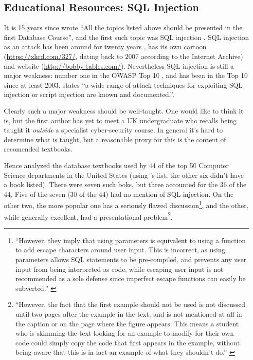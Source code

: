 \documentclass[sigconf,anonymous]{acmart}
\begin{document}
\subsection{Educational Resources: SQL Injection}\label{sec:SQL}
It is 15 years since \cite{Guimaraesetal2004} 
wrote ``All the topics listed above should be presented in the first
Database Course'', and the first such topic was SQL injection \cite{SPIDynamics2002,Anonymous2018b}. SQL injection as an attack has been around for twenty years \cite{HornerHyslip2017a}, has its own cartoon (\url{https://xkcd.com/327/}, dating back to 2007 according to the Internet Archive) and website (\url{http://bobby-tables.com/}). Nevertheless SQL injection is still a major weakness: number one in the OWASP Top 10 \cite{OWASP2017a}, and has been in the Top 10 since at least 2003.  \cite[the UK's definitive reference]{Bristol2018a} states ``a wide range of attack techniques for exploiting SQL
injection or script injection are known and documented.''.

Clearly such a major weakness should be well-taught. One would like to think it is, but the first author has yet to meet a UK undergraduate who recalls being taught it \emph{outside} a specialist cyber-security course.  In general it's hard to determine what is taught, but a reasonable proxy for this is the content of recomended textbooks. 

Hence \cite{Drop2019} analyzed the database textbooks used by  44 of the top 50 Computer Science
departments in the United States (using \cite{StangerMartin2015a}'s list, the other six didn't have a book listed). There were seven such boks, but three accounted for the 36 of the 44. Five of the seven (30 of the 44) had no mention of SQL injection. On the other two, the more popular one has a seriously flawed discussion\footnote{``However, they imply that using parameters is equivalent to using a function to add escape characters
around user input. This is incorrect, as using parameters allows
SQL statements to be pre-compiled, and prevents any user input
from being interpreted as code, while escaping user input is not
recommended as a sole defense since imperfect escape functions
can easily be subverted.'' \cite{Drop2019}}, and the other, while generally excellent, had a presentational problem\footnote{``However, the fact that the first
example should not be used is not discussed until two pages after
the example in the text, and is not mentioned at all in the caption or
on the page where the figure appears. This means a student who is
skimming the text looking for an example to modify for their own
code could simply copy the code that first appears in the example,
without being aware that this is in fact an example of what they
shouldn't do.'' \cite{Drop2019}}.
\end{document}
